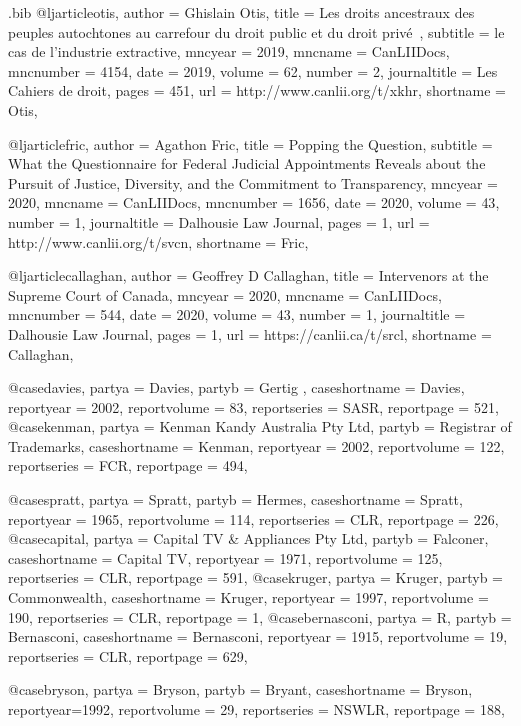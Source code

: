 \begin{filecontents*}[overwrite]{\jobname.bib}
@ljarticle{otis,	author =  {Ghislain Otis},	title =  {Les droits ancestraux des peuples autochtones au carrefour du droit public et du droit privé~},	subtitle =  {le cas de l’industrie extractive},	mncyear =  {2019},	mncname =  {CanLIIDocs},	mncnumber =  {4154},	date =  {2019},	volume =  {62},	number =  {2},	journaltitle =  {Les Cahiers de droit},	pages =  {451},	url =  {http://www.canlii.org/t/xkhr},	shortname =  {Otis},		}

@ljarticle{fric,	author =  {Agathon Fric},	title =  {Popping the Question},	subtitle =  {What the Questionnaire for Federal Judicial Appointments Reveals about the Pursuit of Justice, Diversity, and the Commitment to Transparency},	mncyear =  {2020},	mncname =  {CanLIIDocs},	mncnumber =  {1656},	date =  {2020},	volume =  {43},	number =  {1},	journaltitle =  {Dalhousie Law Journal},	pages =  {1},	url =  {http://www.canlii.org/t/svcn},	shortname =  {Fric},		}


@ljarticle{callaghan,	author =  {Geoffrey D Callaghan},	title =  {Intervenors at the Supreme Court of Canada},		mncyear =  {2020},	mncname =  {CanLIIDocs},	mncnumber =  {544},	date =  {2020},	volume =  {43},	number =  {1},	journaltitle =  {Dalhousie Law Journal},	pages =  {1},	url =  {https://canlii.ca/t/srcl},		shortname =  {Callaghan},	}


@case{davies,	partya =  {Davies},	partyb =  {Gertig },	caseshortname =  {Davies},	reportyear =  {2002},	reportvolume =  {83},		reportseries =  {SASR},	reportpage =  {521},		}
@case{kenman,	partya =  {Kenman Kandy Australia Pty Ltd},	partyb =  {Registrar of Trademarks},	caseshortname =  {Kenman},	reportyear =  {2002},	reportvolume =  {122},		reportseries =  {FCR},	reportpage =  {494},		}

@case{spratt,	partya =  {Spratt},	partyb =  {Hermes},	caseshortname =  {Spratt},	reportyear =  {1965},	reportvolume =  {114},		reportseries =  {CLR},	reportpage =  {226},		}
@case{capital,	partya =  {Capital TV \& Appliances Pty Ltd},	partyb =  {Falconer},	caseshortname =  {Capital TV},	reportyear =  {1971},	reportvolume =  {125},		reportseries =  {CLR},	reportpage =  {591},		}
@case{kruger,	partya =  {Kruger},	partyb =  {Commonwealth},	caseshortname =  {Kruger},	reportyear =  {1997},	reportvolume =  {190},		reportseries =  {CLR},	reportpage =  {1},		}
@case{bernasconi,	partya =  {R},	partyb =  {Bernasconi},	caseshortname =  {Bernasconi},	reportyear =  {1915},	reportvolume =  {19},		reportseries =  {CLR},	reportpage =  {629},		}


@case{bryson,
  partya = {Bryson}, 
  partyb = {Bryant},
  caseshortname = {Bryson},
  reportyear={1992},
  reportvolume = {29},
  reportseries = {NSWLR},
  reportpage = {188},
	}






\end{filecontents*}
